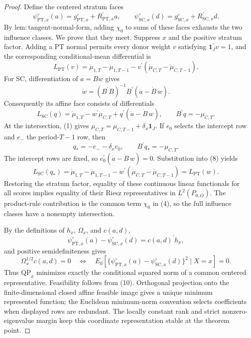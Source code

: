 \documentclass{article}
\begin{document}
\begin{proof}
Define the centered stratum faces
\[
 \psi^{\circ}_{\mathrm{PT},x}(a)=g^{\circ}_{\mathrm{PT},x}+R_{\mathrm{PT},x}^{\prime}a,
 \qquad
 \psi^{\circ}_{\mathrm{SC},x}(d)=g^{\circ}_{\mathrm{SC},x}+R_{\mathrm{SC},x}^{\prime}d.
 \tag{5}
\]
By \(\mathrm{lem{:}tangent\text{-}normal\text{-}form}\), adding \(\chi_0\) to sums of these faces exhausts the two influence classes.  We prove that they meet.  Suppress \(x\) and the positive stratum factor.  Adding a PT normal permits every donor weight \(v\) satisfying \(\mathbf 1_J^{\prime}v=1\), and the corresponding conditional-mean differential is
\[
 L_{\mathrm{PT}}(v)=\dot\mu_{1,T}-\dot\mu_{1,T-1}
 -v^{\prime}(\dot\mu_{C,T}-\dot\mu_{C,T-1}).
 \tag{6}
\]
For SC, differentiation of \(a=Bw\) gives
\[
 \dot w=(B^{\prime}B)^{-1}B^{\prime}(\dot a-\dot B\,w).
 \tag{7}
\]
Consequently its affine face consists of differentials
\[
 L_{\mathrm{SC}}(q)=\dot\mu_{1,T}-w^{\prime}\dot\mu_{C,T}
 +q^{\prime}(\dot a-\dot B\,w),
 \qquad B^{\prime}q=-\mu_{C,T}.
 \tag{8}
\]
At the intersection, (1) gives \(\mu_{C,T}=\mu_{C,T-1}+\delta_x\mathbf 1_J\).  If \(e_0\) selects the intercept row and \(e_-\) the period-\(T-1\) row, then
\[
 q_*=-e_- -\delta_xe_0,
 \qquad B^{\prime}q_*=-\mu_{C,T}.
 \tag{9}
\]
The intercept rows are fixed, so \(e_0^{\prime}(\dot a-\dot B\,w)=0\).  Substitution into (8) yields
\[
 L_{\mathrm{SC}}(q_*)
 =\dot\mu_{1,T}-\dot\mu_{1,T-1}
 -w^{\prime}(\dot\mu_{C,T}-\dot\mu_{C,T-1})
 =L_{\mathrm{PT}}(w).
 \tag{10}
\]
Restoring the stratum factor, equality of these continuous linear functionals for all scores implies equality of their Riesz representatives in \(L^2(P_{0,O})\).  The product-rule contribution is the common term \(\chi_0\) in (4), so the full influence classes have a nonempty intersection.

By the definitions of \(h_x\), \(\Omega_x\), and \(c(a,d)\),
\[
 \psi^{\circ}_{\mathrm{PT},x}(a)-\psi^{\circ}_{\mathrm{SC},x}(d)
 =c(a,d)^{\prime}h_x,
 \tag{11}
\]
and positive semidefiniteness gives
\[
 \Omega_x^{1/2}c(a,d)=0
 \quad\Longleftrightarrow\quad
 E_0[\{\psi^{\circ}_{\mathrm{PT},x}(a)-\psi^{\circ}_{\mathrm{SC},x}(d)\}^2\mid X=x]=0.
 \tag{12}
\]
Thus \(\mathrm{QP}_x\) minimizes exactly the conditional squared norm of a common centered representative.  Feasibility follows from (10).  Orthogonal projection onto the finite-dimensional closed affine feasible image gives a unique minimum represented function; the Euclidean minimum-norm convention selects coefficients when displayed rows are redundant.  The locally constant rank and strict nonzero-eigenvalue margin keep this coordinate representation stable at the theorem point.


\end{proof}
\end{document}
